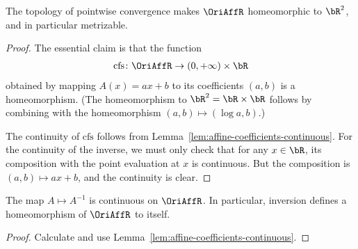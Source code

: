 \begin{lemma}
  \label{lem:affine-metrizable}
  \leanok
  The topology of pointwise convergence makes $\OriAffR$
  homeomorphic to $\bR^2$, and in particular
  metrizable.
\end{lemma}
\begin{proof}
  The essential claim is that the function
  \begin{align*}
    \mathrm{cfs} \colon \OriAffR \to (0,+\infty) \times \bR
  \end{align*}
  obtained by mapping $A(x) = a x + b$ to its coefficients $(a,b)$ is a homeomorphism.
  (The homeomorphism to $\bR^2 = \bR \times \bR$ follows by combining with the
  homeomorphism $(a,b) \mapsto (\log a, b)$.)

  The continuity of $\mathrm{cfs}$ follows from Lemma~\ref{lem:affine-coefficients-continuous}.
  For the continuity of the inverse, we must only check that for any $x \in \bR$,
  its composition with the point evaluation at $x$ is continuous. But the composition
  is $(a,b) \mapsto a x + b$, and the continuity is clear.
\end{proof}

\begin{lemma}
  \label{lem:affine-inversion-continuous}
  \leanok
  The map $A \mapsto A^{-1}$ is continuous on $\OriAffR$.
  In particular, inversion defines a homeomorphism of $\OriAffR$ to itself.
\end{lemma}
\begin{proof}
  Calculate and use Lemma~\ref{lem:affine-coefficients-continuous}.
\end{proof}

